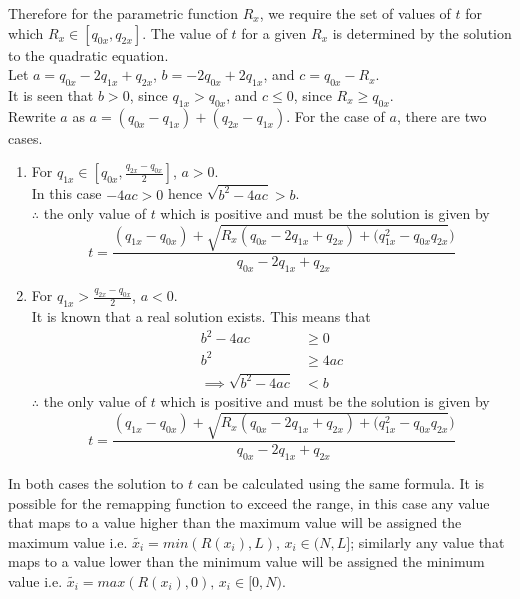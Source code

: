\begin{definition}
	Therefore for the parametric function $R_x$, we require the set of values of $t$ for which $R_x \in [q_{0x},q_{2x}]$. The value of $t$ for a given $R_x$ is determined by the solution to the quadratic equation.\\
	Let $a=q_{0x}-2q_{1x}+q_{2x}$, $b=-2q_{0x}+2q_{1x}$, and $c=q_{0x}-R_x$.\\
	It is seen that $b>0$, since $q_{1x} > q_{0x}$, and $c \leq 0$, since $R_x \geq q_{0x}$.\\
	Rewrite $a$ as $a=(q_{0x}-q_{1x}) + (q_{2x}-q_{1x})$.
	For the case of $a$, there are two cases.
	
	\begin{enumerate}
		\item
		For $q_{1x} \in [q_{0x}, \frac{q_{2x}-q_{0x}}{2}]$, $a>0$.\\
		In this case $-4ac>0$ hence $\sqrt{b^2-4ac}>b$.\\
		$\therefore$ the only value of $t$ which is positive and must be the solution is given by
		\begin{equation}\label{eq:qt1}
			t =  \frac{(q_{1x}-q_{0x}) + \sqrt{R_x(q_{0x}-2q_{1x}+q_{2x})+(q_{1x}^2-q_{0x}q_{2x}})}{q_{0x}-2q_{1x}+q_{2x}}
		\end{equation}

		\item
		For $q_{1x}>\frac{q_{2x}-q_{0x}}{2}$, $a<0$.\\
		It is known that a real solution exists. This means that
		\begin{align*}
			b^2 -4ac &\geq 0 \\
			b^2 &\geq 4ac \\
			\implies \sqrt{b^2-4ac} &< b
		\end{align*}
		$\therefore$ the only value of $t$ which is positive and must be the solution is given by
		\begin{equation}\label{eq:qt2}
			t =  \frac{(q_{1x}-q_{0x}) + \sqrt{R_x(q_{0x}-2q_{1x}+q_{2x})+(q_{1x}^2-q_{0x}q_{2x}})}{q_{0x}-2q_{1x}+q_{2x}}
		\end{equation}
	\end{enumerate}

	In both cases the solution to $t$ can be calculated using the same formula.
	It is possible for the remapping function to exceed the range, in this case any value that maps to a value higher than the maximum value will be assigned the maximum value i.e. $\widetilde{x_i} = min(R(x_i),L), \,  x_i \in (N,L]$; similarly any value that maps to a value lower than the minimum value will be assigned the minimum value i.e. $\widetilde{x_i} = max(R(x_i),0), \, x_i \in [0,N)$.
\end{definition}

